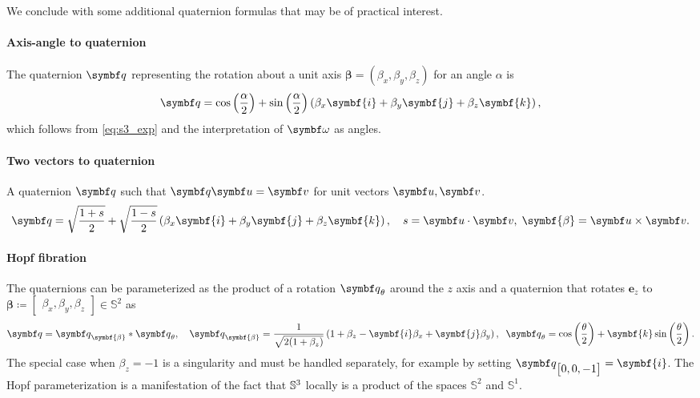 We conclude with some additional quaternion formulas that may be of practical interest.

\begin{properties}[title=Useful quaternion identities]
  \paragraph{Axis-angle to quaternion} The quaternion $\bq$ representing the rotation about a unit axis $\symbf{\beta} = (\beta_x, \beta_y, \beta_z)$ for an angle $\alpha$ is
  \begin{equation}
    \label{eq:axis_angle_to_quaternion}
    \bq = \cos \left( \frac{\alpha}{2} \right) + \sin \left( \frac{\alpha}{2} \right) \left( \beta_x \symbf{i} + \beta_y \symbf{j} + \beta_z \symbf{k} \right),
  \end{equation}
  which follows from \eqref{eq:s3_exp} and the interpretation of $\bomega$ as angles.

  \paragraph{Two vectors to quaternion} A quaternion $\bq$ such that $\bq \bu = \bv$ for unit vectors $\bu, \bv$.
  \begin{equation}
    \label{eq:two_vectors_to_quaternion}
    \bq = \sqrt{\frac{1 + s}{2}} + \sqrt{\frac{1 - s}{2}} \left( \beta_x \symbf{i} + \beta_y \symbf{j} + \beta_z \symbf{k} \right), \quad s = \bu \cdot \bv, \; \symbf{\beta} = \bu \times \bv.
  \end{equation}

  \paragraph{Hopf fibration} The quaternions can be parameterized as the product of a rotation $\bq_\theta$ around the $z$ axis and a quaternion that rotates $\symbf{e}_z$ to $\symbf{\beta} \coloneq \begin{bmatrix} \beta_x, \beta_y, \beta_z \end{bmatrix} \in \mathbb{S}^2$ as
  \begin{equation}
    \bq = \bq_{\symbf{\beta}} * \bq_{\theta}, \quad \bq_{\symbf{\beta}} = \frac{1}{\sqrt{2(1 + \beta_z)}} \left( 1 + \beta_z - \symbf{i} \beta_x + \symbf{j} \beta_y \right), \; \; \bq_{\theta} = \cos \left( \frac{\theta}{2} \right) + \symbf{k} \sin \left( \frac{\theta}{2} \right).
  \end{equation}
  The special case when $\beta_z = -1$ is a singularity and must be handled separately, for example by setting $\bq_{\begin{bmatrix}0, 0, -1\end{bmatrix}} = \symbf{i}$. The Hopf parameterization is a manifestation of the fact that ${\mathbb{S}^3}$ locally is a product of the spaces $\mathbb{S}^2$ and $\mathbb{S}^1$.
\end{properties}
